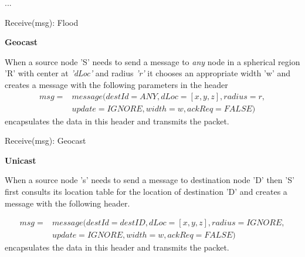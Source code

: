\begin{algorithm}
\SetAlgoLined
\DontPrintSemicolon
{} { 
}{
    ...
}
\caption{Receive(msg): Flood} \label{flood_recv}
\end{algorithm}

\textbf{Geocast}


When a source node 'S' needs to send a message to \emph{any} node in a spherical region 'R' with center at \emph{'dLoc'} and radius \emph{'r'} it chooses an appropriate width 'w' and creates a message with the following parameters in the header
\begin{eqnarray*}
msg = & message(destId = ANY, dLoc = [x,y,z], radius = r,\\
    & update = IGNORE, width = w, ackReq = FALSE)
\end{eqnarray*}
encapsulates the data in this header and transmits the packet.

\begin{algorithm}
\SetAlgoLined
\DontPrintSemicolon
{}


\caption{Receive(msg): Geocast} \label{geocast_recv}
\end{algorithm}

\textbf{Unicast}

When a source node 's' needs to send a message to destination node 'D' then 'S' first consults its location table for the location of destination 'D' and creates a message with the following header.

\begin{eqnarray*}
msg = & message(destId = destID, dLoc = [x,y,z], radius = IGNORE,\\
    & update = IGNORE, width = w, ackReq = FALSE)
\end{eqnarray*}
encapsulates the data in this header and transmits the packet.

